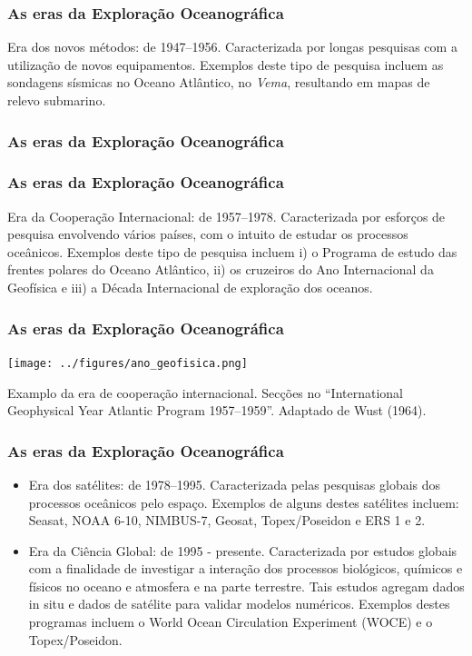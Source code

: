 \begin{frame}
    \frametitle{As eras da Exploração Oceanográfica}
    Era dos novos métodos: de 1947--1956.  Caracterizada por longas pesquisas
    com a utilização de novos equipamentos.  Exemplos deste tipo de pesquisa
    incluem as sondagens sísmicas no Oceano Atlântico, no {\it Vema},
    resultando em mapas de relevo submarino.
\end{frame}

\begin{frame}
    \frametitle{As eras da Exploração Oceanográfica}
    \centerline{}
\end{frame}

\begin{frame}
    \frametitle{As eras da Exploração Oceanográfica}
    Era da Cooperação Internacional: de 1957--1978. Caracterizada por esforços
    de pesquisa envolvendo vários países, com o intuito de estudar os processos
    oceânicos.  Exemplos deste tipo de pesquisa incluem i) o Programa de estudo
    das frentes polares do Oceano Atlântico, ii) os cruzeiros do Ano
    Internacional da Geofísica e iii) a Década Internacional de exploração dos
    oceanos.
\end{frame}

\begin{frame}
    \frametitle{As eras da Exploração Oceanográfica}
    \centerline{\texttt{[image: ../figures/ano\_geofisica.png]}}
    Examplo da era de cooperação internacional.  Secções no ``International
    Geophysical Year Atlantic Program 1957--1959''.  Adaptado de Wust (1964).
\end{frame}

\begin{frame}
    \frametitle{As eras da Exploração Oceanográfica}
    \begin{itemize}[<+-| alert@+>]
    \item \small{Era dos satélites: de 1978--1995. Caracterizada pelas pesquisas
           globais dos processos oceânicos pelo espaço. Exemplos de alguns
           destes satélites incluem: Seasat, NOAA 6-10, NIMBUS-7, Geosat,
           Topex/Poseidon e ERS 1 e 2.}

    \item \small{Era da Ciência Global: de 1995 - presente. Caracterizada por
           estudos globais com a finalidade de investigar a interação dos
           processos biológicos, químicos e físicos no oceano e atmosfera e na
           parte terrestre. Tais estudos agregam dados in situ e dados de
           satélite para validar modelos numéricos. Exemplos destes programas
           incluem o World Ocean Circulation Experiment (WOCE) e o
           Topex/Poseidon.}
    \end{itemize}
\end{frame}

